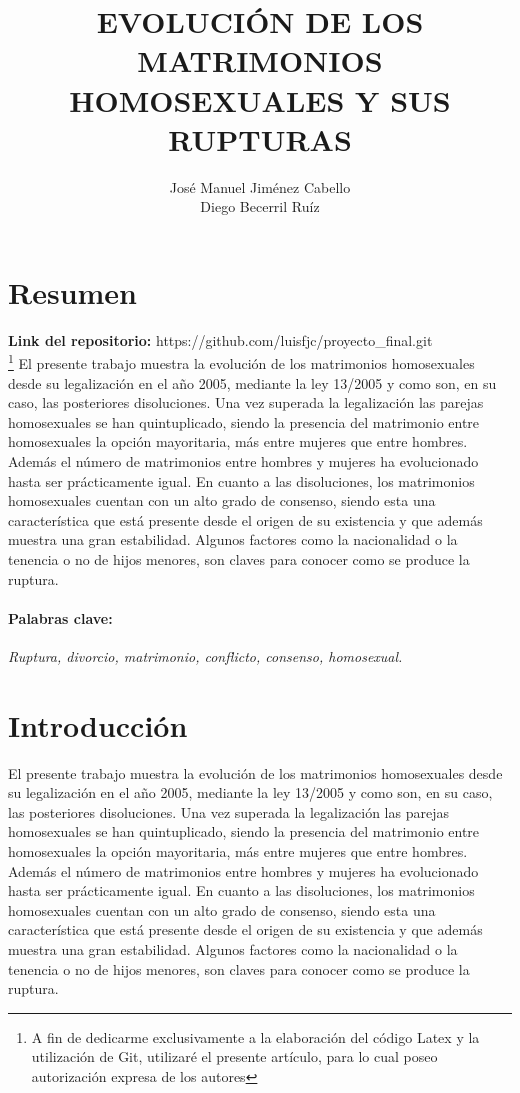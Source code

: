 \documentclass{article}
\begin{document}
	\title{\textbf{\Huge{EVOLUCIÓN DE LOS MATRIMONIOS HOMOSEXUALES Y SUS RUPTURAS}}}
	\author{José Manuel Jiménez Cabello \\ Diego Becerril Ruíz}
	\maketitle
	\newpage
	
	\tableofcontents
	\newpage
	
	\section{Resumen} 
	

\textbf{Link del repositorio:} https://github.com/luisfjc/proyecto\_final.git\\

	\footnote[1]{A fin de dedicarme exclusivamente a la elaboración del código Latex y la utilización de Git, utilizaré el presente artículo, para lo cual poseo autorización expresa de los autores}
El presente trabajo muestra la evolución de los matrimonios homosexuales desde su legalización en el año 2005, mediante la ley 13/2005 y como son, en su caso, las posteriores disoluciones. Una vez superada la legalización las parejas homosexuales se han quintuplicado, siendo la presencia del matrimonio entre homosexuales la opción mayoritaria, más entre mujeres que entre hombres. Además el número de matrimonios entre hombres y mujeres ha evolucionado hasta ser prácticamente igual. En cuanto a las disoluciones, los matrimonios homosexuales cuentan con un alto grado de consenso, siendo esta una característica que está presente desde el origen de su existencia y que además muestra una gran estabilidad. Algunos factores como la nacionalidad o la tenencia o no de hijos menores, son claves para conocer como se produce la ruptura.
\paragraph{Palabras clave:}
 \textit{Ruptura, divorcio, matrimonio, conflicto, consenso, homosexual.}
\section{Introducción}
El presente trabajo muestra la evolución de los matrimonios homosexuales desde su legalización en el año 2005, mediante la ley 13/2005 y como son, en su caso, las posteriores disoluciones. Una vez superada la legalización las parejas homosexuales se han quintuplicado, siendo la presencia del matrimonio entre homosexuales la opción mayoritaria, más entre mujeres que entre hombres. Además el número de matrimonios entre hombres y mujeres ha evolucionado hasta ser prácticamente igual. En cuanto a las disoluciones, los matrimonios homosexuales cuentan con un alto grado de consenso, siendo esta una característica que está presente desde el origen de su existencia y que además muestra una gran estabilidad. Algunos factores como la nacionalidad o la tenencia o no de hijos menores, son claves para conocer como se produce la ruptura.
\end{document}
